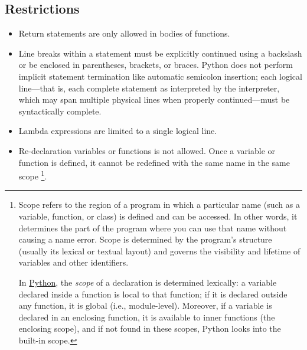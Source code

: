 \subsection*{Restrictions}

\begin{itemize}
\item Return statements are only allowed in bodies of functions.
\item Line breaks within a statement must be explicitly continued using a backslash or be enclosed in parentheses, brackets, or braces. 
Python does not perform implicit statement termination like automatic semicolon insertion; 
each logical line—that is, each complete statement as interpreted by the interpreter, which may span multiple physical lines when properly continued—must be syntactically complete.
\item Lambda expressions are limited to a single logical line.
\item Re-declaration variables or functions is not allowed. Once a variable or function is defined, it cannot be redefined with the same name in the same scope
\footnote{
Scope refers to the region of a program in which a particular name (such as a variable, function, or class) is defined and can be accessed. In other words, 
it determines the part of the program where you can use that name without causing a name error. 
Scope is determined by the program's structure (usually its lexical or textual layout) and governs the visibility and lifetime of variables and other identifiers.

In \href{https://docs.python.org/3/tutorial/classes.html\#python-scopes-and-namespaces}{\color{DarkBlue}Python}, the \emph{scope} of a declaration is determined lexically: a variable declared inside a function is local to that function; 
if it is declared outside any function, it is global (i.e., module-level). Moreover, if a variable is declared in an enclosing function, 
it is available to inner functions (the enclosing scope), and if not found in these scopes, Python looks into the built-in scope.
}.
\end{itemize}


